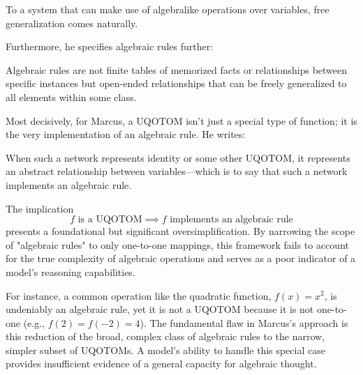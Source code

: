 \documentclass[../../main.tex]{subfiles}
\begin{document}
\begin{citecallout}
    To a system that can make use of algebralike operations over variables,
    free generalization comes naturally.
\end{citecallout}

Furthermore, he specifies algebraic rules further:

\begin{citecallout}
    Algebraic rules are not finite tables of memorized facts or relationships between specific instances but open-ended relationships that can be freely generalized to all elements within some class.
\end{citecallout}

Most decisively, for Marcus, a UQOTOM isn't just a special type of function; it is the very implementation of an algebraic rule. He writes:

\begin{citecallout}
    \begin{premise}
        \label{premise:uqotom_algebraic_rule}
        When such a network represents identity or some other UQOTOM,
        it represents an abstract relationship between variables—which is to say
        that such a network implements an algebraic rule.
    \end{premise}
\end{citecallout}

\begin{critique}
    The implication
    \[
        f \text{ is a UQOTOM} \implies f \text{ implements an algebraic rule}
    \]
    presents a foundational but significant oversimplification. By narrowing the scope of "algebraic rules" to only one-to-one mappings, this framework fails to account for the true complexity of algebraic operations and serves as a poor indicator of a model's reasoning capabilities.

    For instance, a common operation like the quadratic function, $f(x) = x^2$, is undeniably an algebraic rule, yet it is not a UQOTOM because it is not one-to-one (e.g., $f(2) = f(-2) = 4$). The fundamental flaw in Marcus's approach is this reduction of the broad, complex class of algebraic rules to the narrow, simpler subset of UQOTOMs. A model's ability to handle this special case provides insufficient evidence of a general capacity for algebraic thought.
\end{critique}
\end{document}

